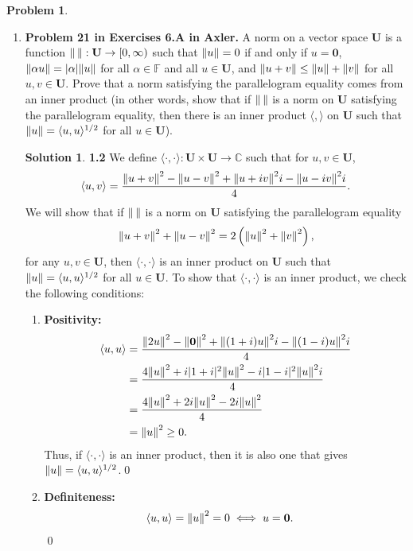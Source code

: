 \documentclass{article}
\theoremstyle{definition}
\newtheorem*{prob*}{Problem}
\newtheorem*{sln*}{Solution}
\newcommand{\U}{\mathbf{U}}
\newcommand{\la}{\langle}
\newcommand{\ra}{\rangle}
\begin{document}
\begin{prob*}
\begin{enumerate}
		
		\newpage
		
		
		
		\item \textbf{Problem 21 in Exercises 6.A in Axler.} A norm on a vector space $\U$ is a function $\norm{\,}: \U \to [0,\infty) $ such that $\norm{u} = 0$ if and only if $u = \mathbf{0}$, $\norm{\alpha u} = \vert \alpha \vert \norm{u}$ for all $\alpha \in \mathbb{F}$ and all $u \in \U$, and $\norm{u + v} \leq \norm{u} + \norm{v}$ for all $u,v \in \U$. Prove that a norm satisfying the parallelogram equality comes from an inner product (in other words, show that if $\norm{\,}$ is a norm on $\U$ satisfying the parallelogram equality, then there is an inner product $\la ,\ra$ on $\U$ such that $\norm{u} = \la u,u\ra^{1/2}$ for all $u\in \U$). 
		
			
		\begin{sln*}\textbf{1.2}
			We define $\la \cdot,\cdot \ra : \U \times \U \to \mathbb{C}$ such that for $u,v \in \U$,
			\begin{align*}
			\la u ,v \ra = \frac{\norm{u+ v}^2  - \norm{u-v}^2 + \norm{u + iv}^2i - \norm{u - iv}^2i   }{4}.
			\end{align*} 
			We will show that if $\norm{\,}$ is a norm on $\U$ satisfying the parallelogram equality 
			\begin{align*}
			\norm{u+v}^2 + \norm{u-v}^2 = 2   \left( \norm{u}^2 + \norm{v}^2 \right),
			\end{align*}
			for any $u,v \in \U$, then $\la \cdot,\cdot\ra$ is an inner product on $\U$ such that $\norm{u} = \la u,u\ra^{1/2}$ for all $u\in \U$.  To show that $\la \cdot , \cdot \ra$ is an inner product, we check the following conditions:
			\begin{enumerate}
				\item \textbf{Positivity:}
				\begin{align*}
				\la u ,u \ra &= \frac{\norm{2u}^2  - \norm{\mathbf{0}}^2 + \norm{(1+i)u}^2i - \norm{(1-i)u}^2i   }{4}\\
				&= \frac{4\norm{u}^2 + i\vert 1+i\vert^2 \norm{u}^2 - i\vert 1 - i \vert^2 \norm{u}^2i   }{4}\\
				&= \frac{4\norm{u}^2 + 2i \norm{u}^2 - 2i \norm{u}^2  }{4}\\
				&= \norm{u}^2 \geq 0.
				\end{align*}
				Thus, if $\la \cdot, \cdot \ra$ is an inner product, then it is also one that gives $\norm{u} = \la u,u\ra^{1/2}$.\qed
				
				\item \textbf{Definiteness:}
				\begin{align*}
				\la u ,u \ra &= \norm{u}^2 = 0 \iff u = \mathbf{0}. 
				\end{align*}\qed
				

\end{enumerate}
\end{sln*}
\end{enumerate}
\end{prob*}
\end{document}
